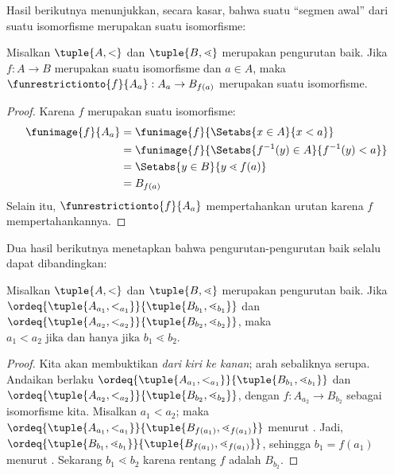 \documentclass[../../../include/open-logic-section]{subfiles}
\begin{document}
Hasil berikutnya menunjukkan, secara kasar, bahwa suatu ``segmen awal'' dari
suatu isomorfisme merupakan suatu isomorfisme:

\begin{lem}
Misalkan $\tuple{A, <}$ dan $\tuple{B, \lessdot}$ merupakan pengurutan baik.
Jika $f \colon A \to B$ merupakan suatu isomorfisme dan $a \in A$, maka
$\funrestrictionto{f}{A_{a}} : A_a \to B_{f(a)}$ merupakan suatu
isomorfisme.
\end{lem}

\begin{proof}
Karena $f$ merupakan suatu isomorfisme:
\begin{align*}
	\funimage{f}{A_a} &= \funimage{f}{\Setabs{x \in A}{x < a}}\\
	&= \funimage{f}{\Setabs{f^{-1}(y) \in A}{f^{-1}(y) < a}} \\
	&= \Setabs{y \in B}{y \lessdot f(a)} \\
	&=B_{f(a)}
\end{align*}
Selain itu, $\funrestrictionto{f}{A_a}$ mempertahankan urutan karena $f$
mempertahankannya.
\end{proof}

Dua hasil berikutnya menetapkan bahwa pengurutan-pengurutan baik selalu dapat
dibandingkan:

\begin{lem}
Misalkan $\tuple{A, <}$ dan $\tuple{B, \lessdot}$ merupakan pengurutan baik.
Jika
$\ordeq{\tuple{A_{a_1}, <_{a_1}}}{\tuple{B_{b_1}, \lessdot_{b_1}}}$ dan
$\ordeq{\tuple{A_{{a_2}}, <_{a_2}}}{\tuple{B_{{b_2}},
\lessdot_{b_2}}}$, maka ${a_1} < {a_2} \text{ jika dan hanya jika }{b_1}
\lessdot {b_2}$.
\end{lem}

\begin{proof}
Kita akan membuktikan \emph{dari kiri ke kanan}; arah sebaliknya serupa.
Andaikan berlaku
$\ordeq{\tuple{A_{a_1}, <_{a_1}}}{\tuple{B_{b_1},
\lessdot_{b_1}}}$ dan
$\ordeq{\tuple{A_{{a_2}}, <_{a_2}}}{\tuple{B_{{b_2}},
\lessdot_{b_2}}}$, dengan $f \colon A_{{a_2}} \to B_{{b_2}}$ sebagai
isomorfisme kita. Misalkan ${a_1} < {a_2}$; maka
$\ordeq{\tuple{A_{a_1}, <_{a_1}}}{\tuple{B_{f({a_1})},
\lessdot_{f({a_1})}}}$ menurut . Jadi,
$\ordeq{\tuple{B_{b_1}, \lessdot_{b_1}}}{\tuple{B_{f({a_1})},
\lessdot_{f({a_1})}}}$, sehingga ${b_1} = f({a_1})$ menurut
. Sekarang ${b_1} \lessdot {b_2}$ karena rentang
$f$ adalah $B_{{b_2}}$.
\end{proof}
\end{document}
